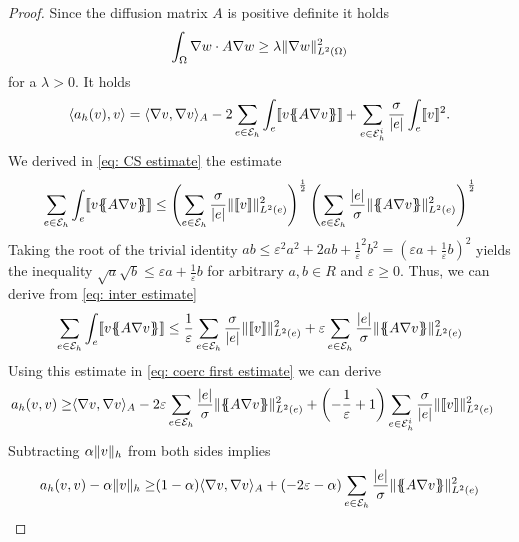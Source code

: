 \begin{proof}
	Since the diffusion matrix $A$ is positive definite it holds
	\begin{align}
		\int_\Omega \nabla w \cdot A \nabla w \geq \lambda \lVert \nabla w  \rVert_{L^2(\Omega)}^2  \label{eq: estimate pos def}
	\end{align}
	for a $\lambda >0$.
	It holds
	\begin{align}
		 \langle a_h(v), v \rangle  =   \langle \nabla v, \nabla v \rangle _A - 2 \sum\limits_{e \in \mathcal{E}_h}\int_{e} \llbracket v \{\!\!\{ A \nabla v \}\!\!\}  \rrbracket + \sum_{e\in \mathcal{E}_h^i} \frac \sigma {|e|} \int_e \llbracket v \rrbracket^2 .\label{eq: coerc first estimate}
	\end{align}
	We derived in \eqref{eq: CS estimate} the estimate 
	\begin{align}
\sum\limits_{e \in \edges}\int_{e} \jump {v \average{A \nabla v} }
 \leq		\left( \sum\limits_{e \in \edges} \frac {\sigma}{|e|} \LTwonormE{\jump {v}}^2 \right)^{\frac 1 2}
		\left( \sum\limits_{e \in \edges} \frac {|e|} \sigma \LTwonormE{\average{A \nabla v}}^2 \right)^{\frac 1 2} \label{eq: inter estimate}
 	\end{align}
	Taking the root of the trivial identity $ab \leq \varepsilon^2 a^2 + 2ab + {\frac 1 \varepsilon}^2b^2 = \left( \varepsilon a + \frac 1 \varepsilon b\right)^2$ yields the inequality $\sqrt{a} \sqrt{b} \leq \varepsilon a + \frac 1 \varepsilon b$ for arbitrary $a,b \in R$ and $\varepsilon \geq 0$. Thus, we can derive from \eqref{eq: inter estimate}
	\begin{align*}
		\sum\limits_{e \in \edges}\int_{e} \jump {v \average{A \nabla v} } \leq \frac 1 \varepsilon \sum\limits_{e \in \edges}\frac \sigma {|e|}\LTwonormE{\jump {v}}^2 
		+ \varepsilon  \sum\limits_{e \in \edges}  \frac {|e|} \sigma \LTwonormE{\average{A \nabla v}}^2
	\end{align*}
	Using this estimate in \eqref{eq: coerc first estimate} we can derive
	\begin{align*}
		a_h(v,v)  \geq&
		   \langle \nabla v, \nabla v \rangle _A 
		 -	 2 \varepsilon  \sum\limits_{e \in \mathcal{E}_h}  \frac {|e|} \sigma \lVert \{\!\!\{ A \nabla v \}\!\!\} \rVert_{L^2(e)}^2
		 + \left(-\frac 1 \varepsilon +1\right) \sum_{e\in \mathcal{E}_h^i}  \frac \sigma {|e|} \lVert \llbracket v \rrbracket \rVert_{L^2(e)}^2
	\end{align*}
	Subtracting $\alpha \lVert v \rVert_{h}$ from both sides implies
	\begin{align}
	a_h(v,v) - \alpha  \eNorm v
	\geq& (1-\alpha) \bilinA {\nabla v} {\nabla v} 
	+ (-2 \varepsilon -\alpha) \sum\limits_{e \in \edges}  \frac {|e|} \sigma \LTwonormE{\average{A \nabla v}}^2 \nonumber\\

\end{align}
\end{proof}
